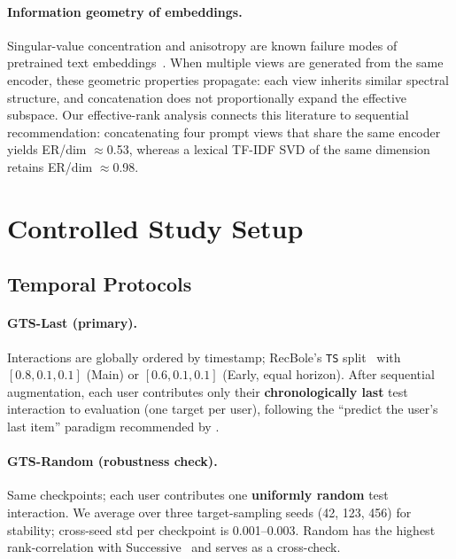 \documentclass[sigconf,natbib=true,anonymous]{acmart}
\newcommand{\tfidf}{\textsc{TF-IDF}\xspace}
\begin{document}
\paragraph{Information geometry of embeddings.}
Singular-value concentration and anisotropy are known failure modes of pretrained text embeddings~\cite{ethayarajh2019contextual}.
When multiple views are generated from the same encoder, these geometric properties propagate: each view inherits similar spectral structure, and concatenation does not proportionally expand the effective subspace.
Our effective-rank analysis connects this literature to sequential recommendation: concatenating four prompt views that share the same encoder yields ER/dim $\approx$0.53, whereas a lexical \tfidf SVD of the same dimension retains ER/dim $\approx$0.98.

\section{Controlled Study Setup}
\label{sec:setup}

\subsection{Temporal Protocols}
\label{sec:protocol}

\paragraph{GTS-Last (primary).}
Interactions are globally ordered by timestamp; RecBole's \texttt{TS} split~\cite{zhao2021recbole} with $[0.8,0.1,0.1]$ (Main) or $[0.6,0.1,0.1]$ (Early, equal horizon).
After sequential augmentation, each user contributes only their \textbf{chronologically last} test interaction to evaluation (one target per user), following the ``predict the user's last item'' paradigm recommended by \citet{liang2024timetosplit}.

\paragraph{GTS-Random (robustness check).}
Same checkpoints; each user contributes one \textbf{uniformly random} test interaction.  We average over three target-sampling seeds (42, 123, 456) for stability; cross-seed std per checkpoint is 0.001--0.003.
Random has the highest rank-correlation with Successive~\cite{liang2024timetosplit} and serves as a cross-check.
\end{document}
